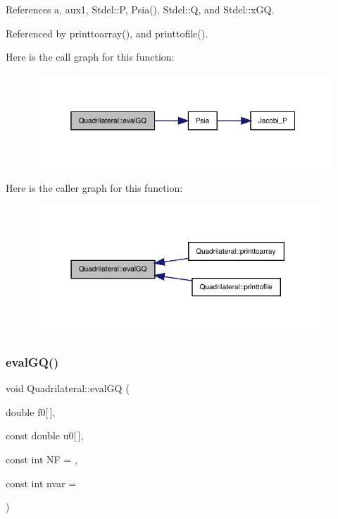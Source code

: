 References a, aux1, Stdel\+::P, Psia(), Stdel\+::Q, and Stdel\+::x\+GQ.



Referenced by printtoarray(), and printtofile().

Here is the call graph for this function\+:
\nopagebreak
\begin{figure}[H]
\begin{center}
\leavevmode
\includegraphics[width=319pt]{classQuadrilateral_a00983ee90b048f655b87943b9fa97ef9_cgraph}
\end{center}
\end{figure}
Here is the caller graph for this function\+:
\nopagebreak
\begin{figure}[H]
\begin{center}
\leavevmode
\includegraphics[width=307pt]{classQuadrilateral_a00983ee90b048f655b87943b9fa97ef9_icgraph}
\end{center}
\end{figure}
\mbox{\label{classQuadrilateral_a329c8c6e8cc339122471f5142818d70e}} 
\subsubsection{\texorpdfstring{eval\+G\+Q()}{evalGQ()}\hspace{0.1cm}{\footnotesize\ttfamily [2/2]}}
{\footnotesize\ttfamily void Quadrilateral\+::eval\+GQ (\begin{DoxyParamCaption}\item[{double}]{f0\mbox{[}$\,$\mbox{]},  }\item[{const double}]{u0\mbox{[}$\,$\mbox{]},  }\item[{const int}]{NF = {},  }\item[{const int}]{nvar = {} }\end{DoxyParamCaption})\hspace{0.3cm}{\ttfamily [virtual]}}



